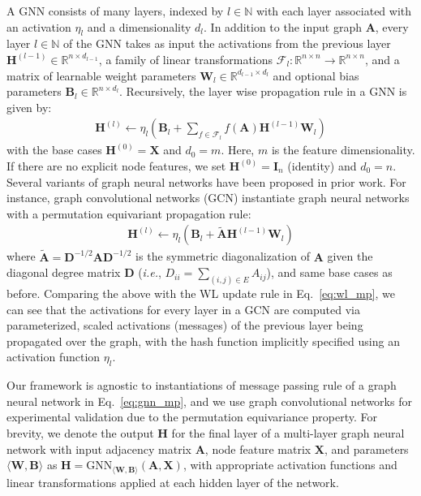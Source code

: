 \documentclass{article}
\begin{document}
A GNN consists of many layers, indexed by $l\in \mathbb{N}$ with each layer associated with an activation $\eta_l$ and a dimensionality $d_l$. In addition to the input graph $\mathbf{A}$, every layer $l\in \mathbb{N}$ of the GNN takes as input the activations from the previous layer $\mathbf{H}^{(l-1)} \in \mathbb{R}^{n \times d_{l-1}}$, a family of linear transformations $\mathcal{F}_{l}: \mathbb{R}^{n \times n} \rightarrow \mathbb{R}^{n \times n}$, and a matrix of learnable weight parameters $\mathbf{W}_{l} \in \mathbb{R}^{d_{l-1} \times d_{l}}$ and optional bias parameters $\mathbf{B}_{l} \in \mathbb{R}^{n \times d_{l}}$. Recursively, the layer wise propagation rule in a GNN is given by:
\begin{align}\label{eq:gnn_mp}
\mathbf{H}^{(l)} \leftarrow \eta_{l}\left( \mathbf{B}_l + \sum_{f \in \mathcal{F}_{l}}f(\mathbf{A})\mathbf{H}^{(l-1)} \mathbf{W}_{l} \right)
\end{align}
with the base cases $\mathbf{H}^{(0)} = \mathbf{X}$ and $d_0=m$.
Here, $m$ is the feature dimensionality.
If there are no explicit node features, we set $\mathbf{H}^{(0)} = \mathbf{I}_n$ (identity) and $d_0=n$.  
Several variants of graph neural networks have been proposed in prior work. For instance, graph convolutional networks (GCN) \cite{kipf2016semi} instantiate graph neural networks with a permutation equivariant propagation rule:
\begin{align}\label{eq:gcn_mp}
\mathbf{H}^{(l)} \leftarrow \eta_{l}\left(\mathbf{B}_l + \tilde{\mathbf{A}}\mathbf{H}^{(l-1)} \mathbf{W}_{l}\right)
\end{align}
where $\tilde{\mathbf{A}}=\mathbf{D}^{-1/2}\mathbf{A}\mathbf{D}^{-1/2}$ is the symmetric diagonalization of $\mathbf{A}$ given the diagonal degree matrix $\mathbf{D}$ (\textit{i.e.}, $D_{ii}= \sum_{(i,j) \in E} A_{ij}$), and same base cases as before.
Comparing the above with the WL update rule in Eq.~\eqref{eq:wl_mp}, we can see that the activations for every layer in a GCN are computed via parameterized, scaled activations (messages) of the previous layer being propagated over the graph, with the hash function implicitly specified using an activation function $\eta_{l}$. 

Our framework is agnostic to  instantiations of message passing rule of a graph neural network in Eq.~\eqref{eq:gnn_mp}, and we use graph convolutional networks for experimental validation due to the permutation equivariance property. For brevity, we denote the output $\mathbf{H}$ for the final layer of a multi-layer graph neural network with input adjacency matrix $\mathbf{A}$, node feature matrix $\mathbf{X}$, and parameters $\langle\mathbf{W},\mathbf{B}\rangle$ as $\mathbf{H} = \mathrm{GNN}_{\langle\mathbf{W},\mathbf{B}\rangle}(\mathbf{A}, \mathbf{X})$, with appropriate activation functions and linear transformations applied at each hidden layer of the network.
\end{document}
